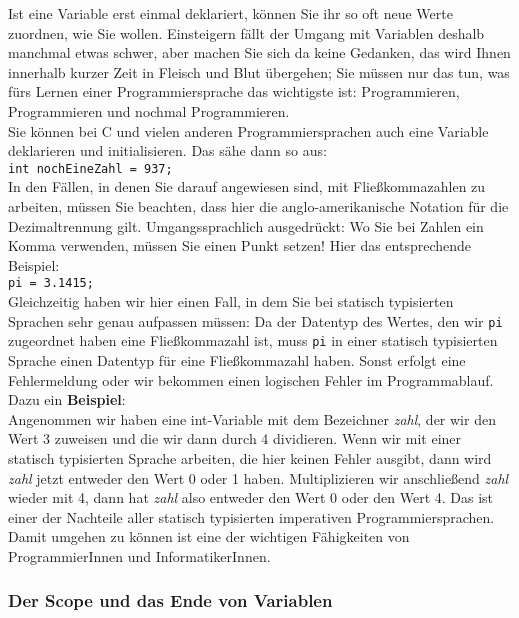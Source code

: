 Ist eine Variable erst einmal deklariert, können Sie ihr so oft neue Werte zuordnen, wie Sie wollen. Einsteigern fällt der Umgang mit Variablen deshalb manchmal etwas schwer, aber machen Sie sich da keine Gedanken, das wird Ihnen innerhalb kurzer Zeit in Fleisch und Blut übergehen; Sie müssen nur das tun, was fürs Lernen einer Programmiersprache das wichtigste ist: Programmieren, Programmieren und nochmal Programmieren.\\

Sie können bei C und vielen anderen Programmiersprachen auch eine Variable deklarieren und initialisieren. Das sähe dann so aus:\\

\verb|int nochEineZahl = 937;|\\

In den Fällen, in denen Sie darauf angewiesen sind, mit Fließkommazahlen zu arbeiten, müssen Sie beachten, dass hier die anglo-amerikanische Notation für die Dezimaltrennung gilt. Umgangssprachlich ausgedrückt: Wo Sie bei Zahlen ein Komma verwenden, müssen Sie einen Punkt setzen! Hier das entsprechende Beispiel:\\

\verb|pi = 3.1415;|\\

Gleichzeitig haben wir hier einen Fall, in dem Sie bei statisch typisierten Sprachen sehr genau aufpassen müssen: Da der Datentyp des Wertes, den wir \verb|pi| zugeordnet haben eine Fließkommazahl ist, muss \verb|pi| in einer statisch typisierten Sprache einen Datentyp für eine Fließkommazahl haben. Sonst erfolgt eine Fehlermeldung oder wir bekommen einen logischen Fehler im Programmablauf.\\

Dazu ein \textbf{Beispiel}:\\

Angenommen wir haben eine int-Variable mit dem Bezeichner \emph{zahl}, der wir den Wert 3 zuweisen und die wir dann durch 4 dividieren. Wenn wir mit einer statisch typisierten Sprache arbeiten, die hier keinen Fehler ausgibt, dann wird \emph{zahl} jetzt entweder den Wert 0 oder 1 haben. Multiplizieren wir anschließend \emph{zahl} wieder mit 4, dann hat \emph{zahl} also entweder den Wert 0 oder den Wert 4. Das ist einer der Nachteile aller statisch typisierten imperativen Programmiersprachen. Damit umgehen zu können ist eine der wichtigen Fähigkeiten von ProgrammierInnen und InformatikerInnen.

\subsubsection{Der Scope und das Ende von Variablen}


